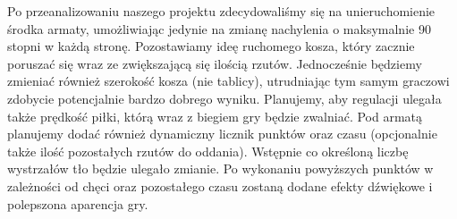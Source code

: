 \documentclass{article}
\begin{document}
\smallskip
\large Po przeanalizowaniu naszego projektu zdecydowaliśmy się na unieruchomienie środka armaty, umożliwiając jedynie na zmianę nachylenia o maksymalnie 90 stopni w każdą stronę. Pozostawiamy ideę ruchomego kosza, który zacznie poruszać się wraz ze zwiększającą się ilością rzutów. Jednocześnie będziemy zmieniać również szerokość kosza (nie tablicy), utrudniając tym samym graczowi zdobycie potencjalnie bardzo dobrego wyniku. Planujemy, aby regulacji ulegała także prędkość piłki, którą wraz z biegiem gry będzie zwalniać. Pod armatą planujemy dodać również dynamiczny licznik punktów oraz czasu (opcjonalnie także ilość pozostałych rzutów do oddania). Wstępnie co określoną liczbę wystrzałów tło będzie ulegało zmianie. Po wykonaniu powyższych punktów w zależności od chęci oraz pozostałego czasu zostaną dodane efekty dźwiękowe i polepszona aparencja gry.  \\
\end{document}
